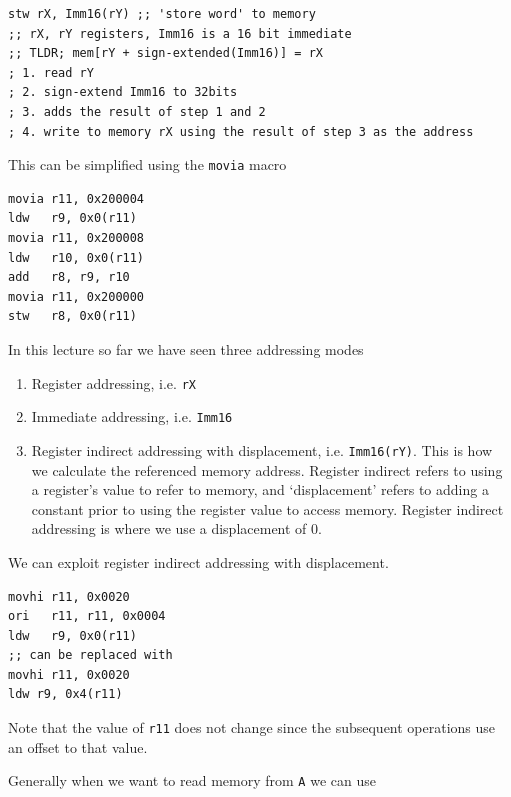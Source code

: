 \documentclass[../notes.tex]{subfiles}
\begin{document}
\begin{listing}[H]
\begin{verbatim}
stw rX, Imm16(rY) ;; 'store word' to memory
;; rX, rY registers, Imm16 is a 16 bit immediate
;; TLDR; mem[rY + sign-extended(Imm16)] = rX
; 1. read rY
; 2. sign-extend Imm16 to 32bits
; 3. adds the result of step 1 and 2
; 4. write to memory rX using the result of step 3 as the address
\end{verbatim}
\end{listing}

This can be simplified using the \texttt{movia} macro

\begin{listing}[H]
\begin{verbatim}
movia r11, 0x200004
ldw   r9, 0x0(r11)
movia r11, 0x200008
ldw   r10, 0x0(r11)
add   r8, r9, r10
movia r11, 0x200000
stw   r8, 0x0(r11)
\end{verbatim}
\end{listing}


In this lecture so far we have seen three addressing modes

\begin{enumerate}
	\item Register addressing, i.e. \texttt{rX} 
	\item Immediate addressing, i.e. \texttt{Imm16}
	\item Register indirect addressing with displacement, i.e. \texttt{Imm16(rY)}. This is how we calculate the referenced memory address. Register indirect refers to using a register's value to refer to memory, and `displacement' refers to adding a constant prior to using the register value to access memory. Register indirect addressing is where we use a displacement of 0.
\end{enumerate}


We can exploit register indirect addressing with displacement.

\begin{listing}[H]
\begin{verbatim}
movhi r11, 0x0020
ori   r11, r11, 0x0004
ldw   r9, 0x0(r11)
;; can be replaced with
movhi r11, 0x0020
ldw r9, 0x4(r11)
\end{verbatim}
\end{listing}

Note that the value of \texttt{r11} does not change since the subsequent operations use an offset to that value.

Generally when we want to read memory from \texttt{A} we can use
\end{document}
